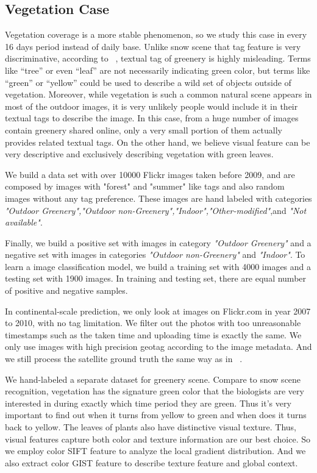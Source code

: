 \subsection{Vegetation Case}

Vegetation coverage is a more stable phenomenon, so we study this case in every 16 days period instead of daily base.
Unlike snow scene that 
tag feature is very discriminative, according 
to ~\cite{ecology2012www}, textual tag of greenery is highly misleading. 
Terms like ``tree'' or even ``leaf'' are not necessarily 
indicating green color, but terms like ``green'' or 
``yellow'' could be used to describe a wild set of objects outside of vegetation. Moreover, while vegetation is 
such a common natural scene appears in most of the outdoor images, it is very unlikely people would include it in their textual tags 
to describe the image. In this case, from a huge number of images contain greenery shared online, only a very small portion of them 
actually provides related textual tags. On the other hand, we believe visual feature can be very descriptive and exclusively 
describing vegetation with green leaves.



We build a data set with over 10000 Flickr images taken before 2009, and are composed by images with "forest" and "summer" like tags 
and also random images without any tag preference. These images are hand labeled with categories 
\textit{"Outdoor Greenery","Outdoor non-Greenery","Indoor","Other-modified"},and \textit{"Not available"}.

Finally, we build a positive set with images in category \textit{"Outdoor Greenery"} and a negative set 
with images in categories \textit{"Outdoor non-Greenery"} and \textit{"Indoor"}. To learn a image classification model, 
we build a training set with 4000 images and a testing set with 1900 images. 
In training and testing set, there are equal number of positive and negative samples.

In continental-scale prediction, we only look at images on Flickr.com in year 2007 to 2010, with no tag limitation. 
We filter out the photos with too unreasonable timestamps such as the taken time and uploading time is exactly the same.
We only use images with high precision geotag according to the image metadata. And we still process the 
satellite ground truth the same way as in ~\cite{ecology2012www}.



We hand-labeled a separate dataset for greenery scene.
Compare to snow scene recognition,
vegetation has the signature green color that the  
biologists are very interested in during exactly which time period they are green. 
Thus it's very important 
to find out when it turns from yellow to green and when does it turns back to yellow.
The leaves of plants also have distinctive visual texture. 
Thus, visual features capture both color and texture information are our best choice.
So we employ color SIFT feature to analyze the local gradient distribution. 
And we also extract color GIST feature to describe texture feature and global context. 

